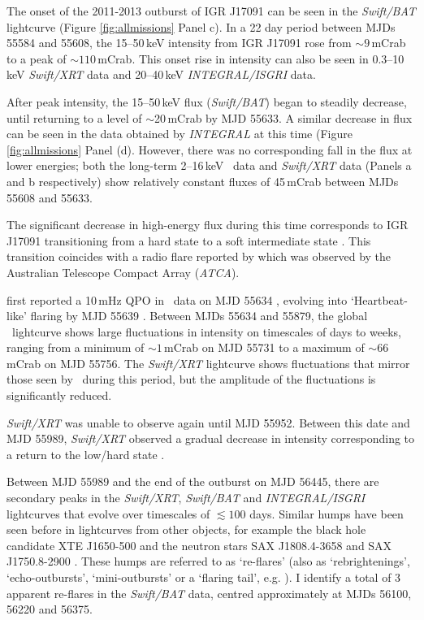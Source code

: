 \par The onset of the 2011-2013 outburst of IGR J17091 can be seen in the \textit{Swift/BAT} lightcurve (Figure \ref{fig:allmissions} Panel c).  In a 22 day period between MJDs 55584 and 55608, the 15--50\,keV intensity from IGR J17091 rose from $\sim9$\,mCrab to a peak of $\sim110$\,mCrab.  This onset rise in intensity can also be seen in 0.3--10\,keV \textit{Swift/XRT} data and 20--40\,keV \textit{INTEGRAL/ISGRI} data.
\par After peak intensity, the 15--50\,keV flux (\textit{Swift/BAT}) began to steadily decrease, until returning to a level of $\sim$20\,mCrab by MJD 55633.  A similar decrease in flux can be seen in the data obtained by \textit{INTEGRAL} at this time (Figure \ref{fig:allmissions} Panel (d).  However, there was no corresponding fall in the flux at lower energies; both the long-term 2--16\,keV \rxte\ data and \textit{Swift/XRT} data (Panels a and b respectively) show relatively constant fluxes of 45\,mCrab between MJDs 55608 and 55633.
\par The significant decrease in high-energy flux during this time corresponds to IGR J17091 transitioning from a hard state to a soft intermediate state \citep{Pahari_RhoDiff}.  This transition coincides with a radio flare reported by \citet{Rodriguez_D} which was observed by the Australian Telescope Compact Array (\textit{ATCA}).
\par \citealp{Altamirano_10Hz} first reported a 10\,mHz QPO in \rxte\ data on MJD 55634 , evolving into `Heartbeat-like' flaring by MJD 55639 \citep{Altamirano_Discovery}.  Between MJDs 55634 and 55879, the global \rxte\ lightcurve shows large fluctuations in intensity on timescales of days to weeks, ranging from a minimum of $\sim1$\,mCrab on MJD 55731 to a maximum of $\sim66$\,mCrab on MJD 55756.  The \textit{Swift/XRT} lightcurve shows fluctuations that mirror those seen by \rxte\ during this period, but the amplitude of the fluctuations is significantly reduced.
\par \textit{Swift/XRT} was unable to observe again until MJD 55952.  Between this date and MJD 55989, \textit{Swift/XRT} observed a gradual decrease in intensity corresponding to a return to the low/hard state \citep{Drave_Return}.
\par Between MJD 55989 and the end of the outburst on MJD 56445, there are secondary peaks in the \textit{Swift/XRT}, \textit{Swift/BAT} and \textit{INTEGRAL/ISGRI} lightcurves that evolve over timescales of $\lesssim100$ days.  Similar humps have been seen before in lightcurves from other objects, for example the black hole candidate XTE J1650-500 \citep{Tomsick_MiniOutbursts} and the neutron stars SAX J1808.4-3658 \citep{Wijnands_1808} and SAX J1750.8-2900 \citep{Allen_1750}.  These humps are referred to as `re-flares' (also as `rebrightenings',  `echo-outbursts', `mini-outbursts' or a `flaring tail', e.g. \citealp{Patruno_Reflares2}).  I identify a total of 3 apparent re-flares in the \textit{Swift/BAT} data, centred approximately at MJDs 56100, 56220 and 56375.
